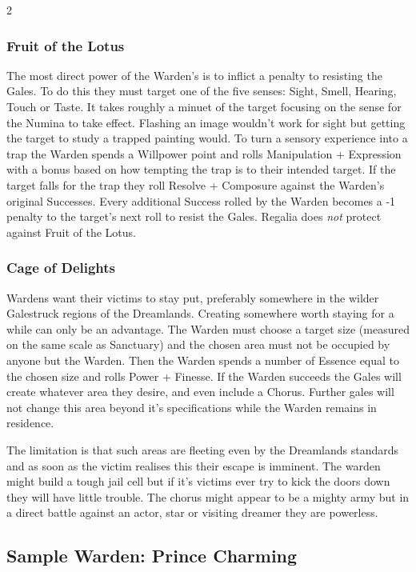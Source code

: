 \begin{multicols}{2}
\subsubsection*{Fruit of the Lotus}

The most direct power of the Warden's is to inflict a penalty to resisting the Gales. To do this they must target one of the five senses: Sight, Smell, Hearing, Touch or Taste. It takes roughly a minuet of the target focusing on the sense for the Numina to take effect. Flashing an image wouldn't work for sight but getting the target to study a trapped painting would. To turn a sensory experience into a trap the Warden spends a Willpower point and rolls Manipulation + Expression with a bonus based on how tempting the trap is to their intended target. If the target falls for the trap they roll Resolve + Composure against the Warden's original Successes. Every additional Success rolled by the Warden becomes a -1 penalty to the target's next roll to resist the Gales. Regalia does \textit{not} protect against Fruit of the Lotus. 

\subsubsection*{Cage of Delights}

Wardens want their victims to stay put, preferably somewhere in the wilder Galestruck regions of the Dreamlands. Creating somewhere worth staying for a while can only be an advantage. The Warden must choose a target size (measured on the same scale as Sanctuary) and the chosen area must not be occupied by anyone but the Warden. Then the Warden spends a number of Essence equal to the chosen size and rolls Power + Finesse. If the Warden succeeds the Gales will create whatever area they desire, and even include a Chorus. Further gales will not change this area beyond it's specifications while the Warden remains in residence. 

The limitation is that such areas are fleeting even by the Dreamlands standards and as soon as the victim realises this their escape is imminent. The warden might build a tough jail cell but if it's victims ever try to kick the doors down they will have little trouble. The chorus might appear to be a mighty army but in a direct battle against an actor, star or visiting dreamer they are powerless. 

\subsection*{Sample Warden: Prince Charming}


\end{multicols}
